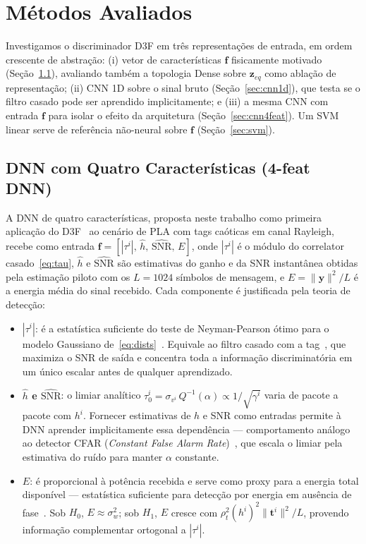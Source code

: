 \documentclass{sbrt}
\begin{document}
\section{Métodos Avaliados}

Investigamos o discriminador D3F em três representações de entrada, em ordem crescente de abstração: (i) vetor de características $\mathbf{f}$ fisicamente motivado (Seção~\ref{sec:dnn4feat}), avaliando também a topologia Dense sobre $\mathbf{z}_{eq}$ como ablação de representação; (ii) CNN 1D sobre o sinal bruto (Seção~\ref{sec:cnn1d}), que testa se o filtro casado pode ser aprendido implicitamente; e (iii) a mesma CNN com entrada $\mathbf{f}$ para isolar o efeito da arquitetura (Seção~\ref{sec:cnn4feat}). Um SVM linear serve de referência não-neural sobre $\mathbf{f}$ (Seção~\ref{sec:svm}).

\subsection{DNN com Quatro Características (4-feat DNN)}\label{sec:dnn4feat}

A DNN de quatro características, proposta neste trabalho como primeira aplicação do D3F~\cite{ref_braca} ao cenário de PLA com tags caóticas em canal Rayleigh, recebe como entrada $\mathbf{f} = [|\tau^i|,\, \hat{h},\, \widehat{\text{SNR}},\, E]$, onde $|\tau^i|$ é o módulo do correlator casado~\eqref{eq:tau}, $\hat{h}$ e $\widehat{\text{SNR}}$ são estimativas do ganho e da SNR instantânea obtidas pela estimação piloto com os $L = 1024$ símbolos de mensagem, e $E = \|\mathbf{y}\|^2/L$ é a energia média do sinal recebido. Cada componente é justificada pela teoria de detecção:

\begin{itemize}
  \item \textbf{$|\tau^i|$}: é a estatística suficiente do teste de Neyman-Pearson ótimo para o modelo Gaussiano de~\eqref{eq:dists}~\cite{ref_poor}. Equivale ao filtro casado com a tag~\cite{ref_proakis}, que maximiza o SNR de saída e concentra toda a informação discriminatória em um único escalar antes de qualquer aprendizado.
  \item \textbf{$\hat{h}$ e $\widehat{\text{SNR}}$}: o limiar analítico $\tau_0^i = \sigma_{v^i}\,Q^{-1}(\alpha) \propto 1/\sqrt{\gamma^i}$ varia de pacote a pacote com $h^i$. Fornecer estimativas de $h$ e SNR como entradas permite à DNN aprender implicitamente essa dependência — comportamento análogo ao detector CFAR (\textit{Constant False Alarm Rate})~\cite{ref_poor}, que escala o limiar pela estimativa do ruído para manter $\alpha$ constante.
  \item \textbf{$E$}: é proporcional à potência recebida e serve como proxy para a energia total disponível — estatística suficiente para detecção por energia em ausência de fase~\cite{ref_poor}. Sob $H_0$, $E \approx \sigma_w^2$; sob $H_1$, $E$ cresce com $\rho_t^2(h^i)^2 \|\mathbf{t}^i\|^2 / L$, provendo informação complementar ortogonal a $|\tau^i|$.
\end{itemize}
\end{document}
